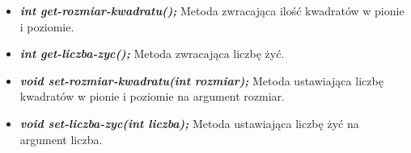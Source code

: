 \documentclass[]{report}
\begin{document}
\begin{itemize}
\begin{itemize}
			\item \textbf{\textit{int get-rozmiar-kwadratu();}} Metoda zwracająca ilość kwadratów w pionie i poziomie.
			
			\item \textbf{\textit{int get-liczba-zyc();}} Metoda zwracająca liczbę żyć.
			
			\item \textbf{\textit{void set-rozmiar-kwadratu(int rozmiar);}} Metoda ustawiająca liczbę kwadratów w pionie i poziomie na argument rozmiar.
			
			\item \textbf{\textit{void set-liczba-zyc(int liczba);}} Metoda ustawiająca liczbę żyć na argument liczba.
		\end{itemize}
		
	\end{itemize}
	
	\newpage
	
\end{document}
